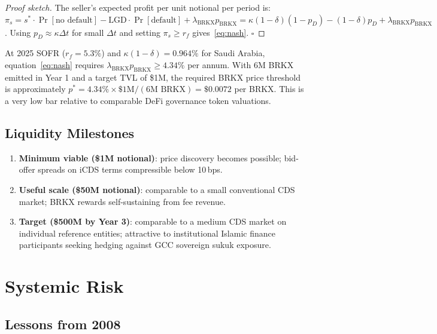 \documentclass[12pt]{article}
\theoremstyle{plain}
\theoremstyle{definition}
\theoremstyle{remark}
\begin{document}
\begin{proof}[Proof sketch]
  The seller's expected profit per unit notional per period is:
  $\pi_s = s^* \cdot \Pr[\text{no default}] - \text{LGD} \cdot \Pr[\text{default}]
         + \lambda_{\text{BRKX}} p_{\text{BRKX}}
         = \kappa(1-\delta)(1-p_D) - (1-\delta)p_D + \lambda_{\text{BRKX}} p_{\text{BRKX}}$.
  Using $p_D \approx \kappa \Delta t$ for small $\Delta t$ and setting
  $\pi_s \geq r_f$ gives~\eqref{eq:nash}. $\square$
\end{proof}

At 2025 SOFR ($r_f = 5.3\%$) and $\kappa(1-\delta) = 0.964\%$ for
Saudi Arabia, equation~\eqref{eq:nash} requires
$\lambda_{\text{BRKX}} p_{\text{BRKX}} \geq 4.34\%$ per annum.
With 6M BRKX emitted in Year 1 and a target TVL of \$1M, the required
BRKX price threshold is approximately
$p^* = 4.34\% \times \$1\text{M} / (6\text{M BRKX}) = \$0.0072$ per BRKX.
This is a very low bar relative to comparable DeFi governance token valuations.

\subsection{Liquidity Milestones}

\begin{enumerate}
  \item \textbf{Minimum viable (\$1M notional)}: price discovery becomes
    possible; bid-offer spreads on iCDS terms compressible below 10\,bps.
  \item \textbf{Useful scale (\$50M notional)}: comparable to a small
    conventional CDS market; BRKX rewards self-sustaining from fee revenue.
  \item \textbf{Target (\$500M by Year 3)}: comparable to a medium CDS market
    on individual reference entities; attractive to institutional Islamic
    finance participants seeking hedging against GCC sovereign sukuk exposure.
\end{enumerate}

\section{Systemic Risk}
\label{sec:systemic}

\subsection{Lessons from 2008}
\end{document}
